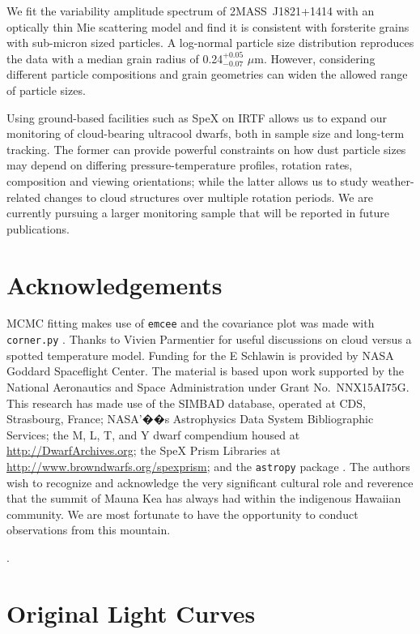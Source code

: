 \documentclass[twocolumn]{aastex6}
\newcommand{\shb}{2MASS~J1821+1414}
\begin{document}
We fit the variability amplitude spectrum of {\shb} with an optically thin Mie scattering model and find it is consistent with forsterite grains with sub-micron sized particles.
A log-normal particle size distribution reproduces the data with a median grain radius of 0.24$^{+0.05}_{-0.07}$ $\mu$m.
However, considering different particle compositions and grain geometries can widen the allowed range of particle sizes.

Using ground-based facilities such as SpeX on IRTF allows us to expand our monitoring of cloud-bearing ultracool dwarfs, both in sample size and long-term tracking. The former can provide powerful constraints on how dust particle sizes may depend on differing pressure-temperature profiles, rotation rates, composition and viewing orientations; while the latter allows us to study weather-related changes to cloud structures over multiple rotation periods. We are currently pursuing a larger monitoring sample that will be reported in future publications.


\section{Acknowledgements}
MCMC fitting makes use of \texttt{emcee} \citep{foreman-mackey2013emcee} and the covariance plot was made with \texttt{corner.py} \citep{foremanCorner}.
Thanks to Vivien Parmentier for useful discussions on cloud versus a spotted temperature model.
Funding for the E Schlawin is provided by NASA Goddard Spaceflight Center.
The material is based upon work supported by
the National Aeronautics and Space Administration under
Grant No.~NNX15AI75G. 
This research has made
use of the SIMBAD database, operated at CDS, Strasbourg,
France; NASA'��s Astrophysics Data System Bibliographic
Services; the M, L, T, and Y dwarf compendium
housed at \url{http://DwarfArchives.org}; the SpeX Prism
Libraries at \url{http://www.browndwarfs.org/spexprism}; and the \texttt{astropy} package \citep{astropy2013}. 
The authors wish to recognize and acknowledge the very significant cultural role and reverence that the summit of Mauna Kea has always had within the indigenous Hawaiian community. We are most fortunate to have the opportunity to conduct observations from this mountain.

\acknowledgments


.

\appendix

\section{Original Light Curves}
\end{document}
